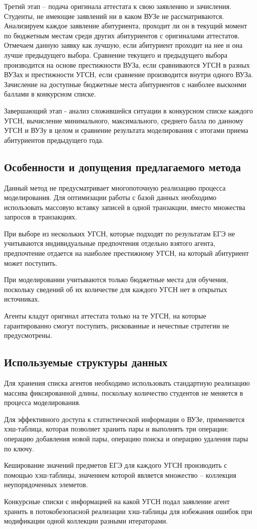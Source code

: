 Третий этап – подача оригинала аттестата к свою заявлению и зачисления. Студенты, не имеющие заявлений ни в каком ВУЗе не рассматриваются. Анализируем каждое заявление абитуриента, проходит ли он в текущий момент по бюджетным местам среди других абитуриентов с оригиналами аттестатов. Отмечаем данную заявку как лучшую, если абитуриент проходит на нее и она лучше предыдущего выбора. Сравнение текущего и предыдущего выбора производится на основе престижности ВУЗа, если сравниваются УГСН в разных ВУЗах и престижности УГСН, если сравнение производится внутри одного ВУЗа. Зачисление на доступные бюджетные места абитуриентов с наиболее выскоими баллами в конкурсном списке.

Завершающий этап - анализ сложившейся ситуации в конкурсном списке каждого УГСН, вычисление минимального, максимального, среднего балла по данному УГСН и ВУЗу в целом и сравнение результата моделирования с итогами приема абитуриентов предыдущего года.

\subsection{Особенности и допущения предлагаемого метода}

Данный метод не предусматривает многопоточную реализацию процесса моделирования. Для оптимизации работы с базой данных необходимо использовать массовую вставку записей в одной транзакции, вместо множества запросов в транзакциях. 

При выборе из нескольких УГСН, которые подходят по результатам ЕГЭ не учитываются индивидуальные предпочтения отдельно взятого агента, предпочтение отдается на наиболее престижному УГСН, на который абитуриент может поступить. 

При моделировании учитываются только бюджетные места для обучения, поскольку сведений об их количестве для каждого УГСН нет в открытых источниках.

Агенты кладут оригинал аттестата только на те УГСН, на которые гарантированно смогут поступить, рискованные и нечестные стратегии не предусмотрены.

\subsection{Используемые структуры данных}

Для хранения списка агентов необходимо использовать стандартную реализацию массива фиксированной длины, поскольку количество студентов не меняется в процесса моделирования.

Для эффективного доступа к статистической информации о ВУЗе, применяется хэш-таблица, которая позволяет хранить пары и выполнять три операции: операцию добавления новой пары, операцию поиска и операцию удаления пары по ключу.

Кеширование значений предметов ЕГЭ для каждого УГСН производить с помощью хэш-таблицы, значением которой является множество – коллекция неупорядоченных элеметов.

Конкурсные списки с информацией на какой УГСН подал заявление агент хранить в потокобезопасной реализации хэш-таблицы для избежания ошибок при модификации одной коллекции разными итераторами.



\pagebreak
